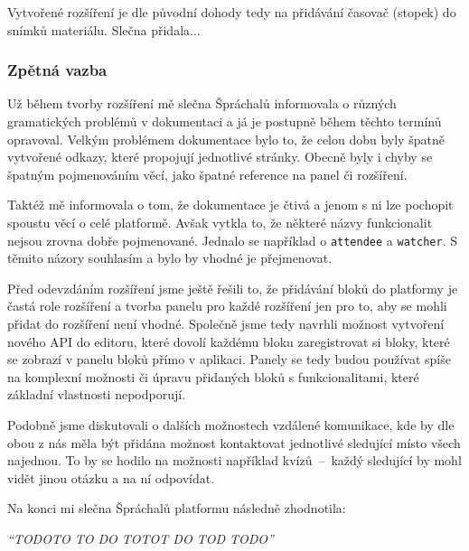 Vytvořené rozšíření je dle původní dohody tedy na přidávání časovač (stopek) do snímků materiálu. 
Slečna přidala...

\subsubsection{Zpětná vazba}

Už během tvorby rozšíření mě slečna Špráchalů informovala o různých gramatických problémů v dokumentaci a já je postupně během těchto termínů opravoval.
Velkým problémem dokumentace bylo to, že celou dobu byly špatně vytvořené odkazy, které propojují jednotlivé stránky.
Obecně byly i chyby se špatným pojmenováním věcí, jako špatné reference na panel či rozšíření.

Taktéž mě informovala o tom, že dokumentace je čtivá a jenom s ni lze pochopit spoustu věcí o celé platformě.
Avšak vytkla to, že některé názvy funkcionalit nejsou zrovna dobře pojmenované. 
Jednalo se například o \verb|attendee| a \verb|watcher|.
S těmito názory souhlasím a bylo by vhodné je přejmenovat. 

Před odevzdáním rozšíření jsme ještě řešili to, že přidávání bloků do platformy je častá role rozšíření a tvorba panelu pro každé rozšíření jen pro to, aby se mohli přidat do rozšíření není vhodné.
Společně jsme tedy navrhli možnost vytvoření nového API do editoru, které dovolí každému bloku zaregistrovat si bloky, které se zobrazí v panelu bloků přímo v aplikaci.
Panely se tedy budou používat spíše na komplexní možnosti či úpravu přidaných bloků s funkcionalitami, které základní vlastnosti nepodporují.

Podobně jsme diskutovali o dalších možnostech vzdálené komunikace, kde by dle obou z nás měla být přidána možnost kontaktovat jednotlivé sledující místo všech najednou.
To by se hodilo na možnosti například kvízů~--~každý sledující by mohl vidět jinou otázku a na ní odpovídat.

Na konci mi slečna Špráchalů platformu následně zhodnotila:

\textit{\enquote{TODOTO TO DO TOTOT DO TOD TODO}}





